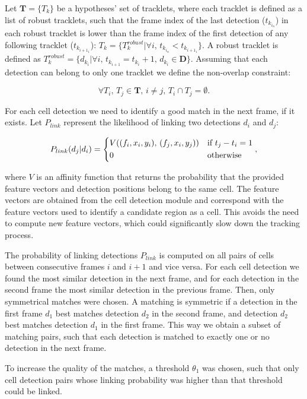 		Let $ \textbf{T} = \{ T_k \} $ be a hypotheses' set of tracklets, where each tracklet is defined as a list of robust tracklets, such that the frame index of the last detection ($ t_{k_{i_n}} $) in each robust tracklet is lower than the frame index of the first detection of any following tracklet ($  t_{k_{{i+1}_1}} $):	$T_k = \{T_k^{robust} | \forall i\text{, }  t_{k_{i_n}} < t_{k_{{i+1}_1}} \}$. A robust tracklet is defined as $ T_k^{robust} = \{ d_{k_i} | \forall i\text{, } t_{k_{i+1}} = t_{k_i}+1\text{, } d_{k_i} \in \textbf{D} \} $. Assuming that each detection can belong to only one tracklet we define the non-overlap constraint:
		
		\[
			\forall T_i \text{, } T_j \in \textbf{T} \text{, } i \neq j \text{, }  T_i \cap T_j = \emptyset \text{.}
		\]
		
		For each cell detection we need to identify a good match in the next frame, if it exists. Let $P_{link}$ represent the likelihood of linking two detections $d_i$ and $d_j$:
		
		\[
			P_{link}(d_j|d_i) = 
			\begin{dcases}
			   V((f_i, x_i, y_i)\text{, } (f_j, x_i, y_j)) & \text{if } t_j - t_i = 1 \\
			   0       & \text{otherwise}
			\end{dcases},
		\]
		
		\noindent where $V$ is an affinity function that returns the probability that the provided feature vectors and detection positions belong to the same cell. The feature vectors are obtained from the cell detection module and correspond with the feature vectors used to identify a candidate region as a cell. This avoids the need to compute new feature vectors, which could significantly slow down the tracking process.

		The probability of linking detections $P_{link}$ is computed on all pairs of cells between consecutive frames $i$ and $i+1$ and vice versa. For each cell detection we found the most similar detection in the next frame, and for each detection in the second frame the most similar detection in the previous frame. Then, only symmetrical matches were chosen. A matching is symmetric if a detection in the first frame $d_1$ best matches detection $d_2$ in the second frame, and detection $d_2$ best matches detection $ d_1 $ in the first frame. This way we obtain a subset of matching pairs, such that each detection is matched to exactly one or no detection in the next frame.
		
		To increase the quality of the matches, a threshold $\theta_1$ was chosen, such that only cell detection pairs whose linking probability was higher than that threshold could be linked.
		
